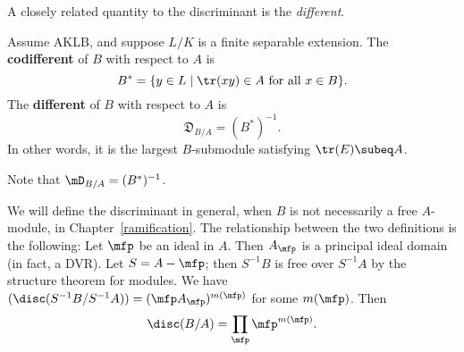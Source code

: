 A closely related quantity to the discriminant is the {\it different}.
\begin{df}
Assume AKLB, and suppose $L/K$ is a finite separable extension. The \textbf{codifferent} of $B$ with respect to $A$ is
\[
B^*=\{y\in L\mid \tr(xy)\in A \text{ for all }x\in B\}.
\]
The \textbf{different} of $B$ with respect to $A$ is
\[
\mathfrak D_{B/A}=(B^*)^{-1}.
\]
In other words, it is the largest $B$-submodule satisfying $\tr(E)\subeq A$.
\end{df}
Note that $\mD_{B/A}=(B^*)^{-1}$.
\begin{rem}
We will define the discriminant in general, when $B$ is not necessarily a free $A$-module, in Chapter~\ref{ramification}.
The relationship between the two definitions is the following: Let $\mfp$ be an ideal in $A$. Then $A_{\mfp}$ is a principal ideal domain (in fact, a DVR). Let $S=A-\mfp$; then $S^{-1}B$ is free over $S^{-1}A$ by the structure theorem for modules. We have $(\disc(S^{-1}B/S^{-1}A))=(\mfp A_{\mfp})^{m(\mfp)}$ for some $m(\mfp)$. Then
\[
\disc(B/A)=\prod_{\mfp}\mfp^{m(\mfp)}.
\]
\end{rem}

